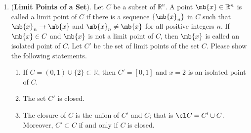 \begin{exercise}
\begin{enumerate}
		\item (\textbf{Limit Points of a Set}). Let $C$ be a subset of $\mathbb{R}^n$. A point $\mb{x}\in \mathbb{R}^n$ is called a limit point of $C$ if there is a sequence $\{\mb{x}_n\}$ in $C$ such that $\mb{x}_n\to \mb{x}$ and $\mb{x}_n \not=\mb{x}$ for all positive integers $n$. If $\mb{x}\in C$ and $\mb{x}$ is not a limit point of $C$, then $\mb{x}$ is called an isolated point of $C$. Let $C'$ be the set of limit points of the set $C$. Please show the following statements.
			\begin{enumerate}
				\item If $C = (0,1)\cup\{2\}\subset \mathbb{R}$, then $C' =[0,1]$ and $x=2$ is an isolated point of $C$.
				\item The set $C'$ is closed.
				\item The closure of $C$ is the union of $C'$ and $C$; that is $\cl C=C' \cup C$. Moreover, $C' \subset C$ if and only if $C$ is closed.
			\end{enumerate}


\end{enumerate}
\end{exercise}
